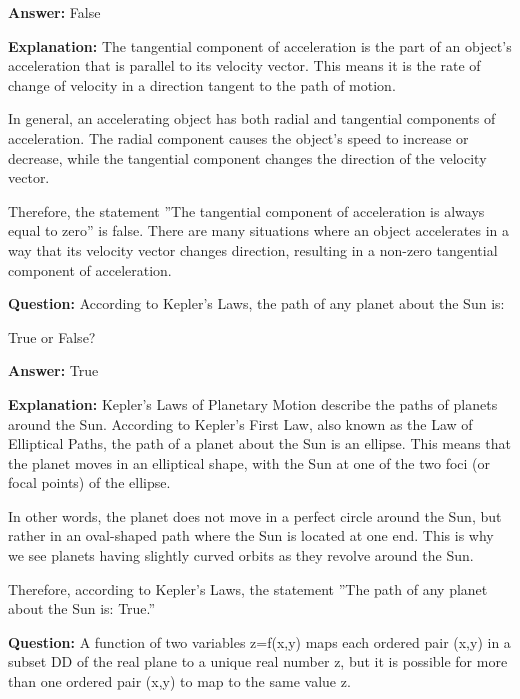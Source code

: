 \documentclass{article}
\begin{document}
                \textbf{Answer:} False

                \textbf{Explanation:} The tangential component of acceleration is the part of an object's acceleration that is parallel to its velocity vector. This means it is the rate of change of velocity in a direction tangent to the path of motion.

In general, an accelerating object has both radial and tangential components of acceleration. The radial component causes the object's speed to increase or decrease, while the tangential component changes the direction of the velocity vector.

Therefore, the statement ''The tangential component of acceleration is always equal to zero'' is false. There are many situations where an object accelerates in a way that its velocity vector changes direction, resulting in a non-zero tangential component of acceleration.
                
                \vspace{0.5cm} 
        
            
                \textbf {Question:} According to Kepler's Laws, the path of any planet about the Sun is:

True or False?
                
                \textbf{Answer:} True

                \textbf{Explanation:} Kepler's Laws of Planetary Motion describe the paths of planets around the Sun. According to Kepler's First Law, also known as the Law of Elliptical Paths, the path of a planet about the Sun is an ellipse. This means that the planet moves in an elliptical shape, with the Sun at one of the two foci (or focal points) of the ellipse.

In other words, the planet does not move in a perfect circle around the Sun, but rather in an oval-shaped path where the Sun is located at one end. This is why we see planets having slightly curved orbits as they revolve around the Sun.

Therefore, according to Kepler's Laws, the statement ''The path of any planet about the Sun is: True.''
                
                \vspace{0.5cm} 
        
            
                \textbf {Question:} A function of two variables z=f(x,y) maps each ordered pair (x,y) in a subset DD of the real plane to a unique real number z, but it is possible for more than one ordered pair (x,y) to map to the same value z.
                
\end{document}

